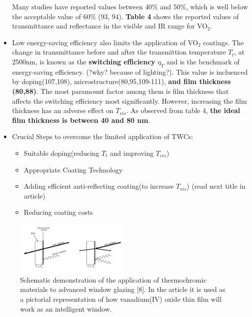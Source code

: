 \begin{itemize}
   Many studies have reported values between $40 \%$ and $50 \%$, which is well below the acceptable
   value of $60 \%$ (93, 94). \textbf{Table 4} shows the reported values of transmittance and reflectance
   in the visible and IR range for VO$_2$.
\item Low energy-saving efficiency also limits the application of VO$_2$ coatings. The
   change in transmittance before and after the transmittion temperature $T_t$, at 2500nm, is
   known as the \textbf{switching efficiency} $\eta_T$ and is the benchmark of energy-saving efficiency.
   (?why? because of lighting?). This value is incluenced by doping(107,108), microstructure(80,95,109-111),
   \textbf{and film thickness (80,88)}. The most paramount factor among them is film thickness that affects
   the switching efficiency most significantly. However, increasing the film thickness has an adverse
   effect on $T_{vis}$. As observed from table 4, \textbf{the ideal film thickness is between 40 and 80 nm}.
\item Crucial Steps to overcome the limited application of TWCs:
   \begin{itemize}
      \item Suitable doping(reducing $T_t$ and improving $T_{vis}$)
      \item Appropriate Coating Technology
      \item Adding efficient anti-reflecting coating(to increase $T_{vis}$) (read next title in article)
      \item Reducing coating costs
   \end{itemize}



      
\end{itemize}

\begin{figure}[h!]
  \centering
   \includegraphics[width=0.5\textwidth]{Figures/TCcoating.pdf}
   \caption{Schematic demonstration of the application of thermochromic materials to advanced window glazing [8].
   In the article it is used as a pictorial representation of how vanadium(IV) oxide thin film will work as 
   an intelligent window. }
\end{figure}



